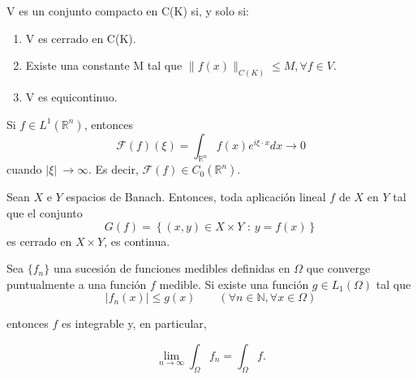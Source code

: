 \begin{lema}\label{thm:h05}
V es un conjunto compacto en C(K) si, y solo si:
\begin{enumerate}

	\item V es cerrado en C(K).
	\item Existe una constante M tal que \(\|f(x)\|_{C(K)} \leq M, \forall f \in V\).
	\item V es equicontinuo. 
\end{enumerate}
\end{lema}

\begin{lema}
Si $f\in L^{1}(\mathds{R}^{n})$, entonces 
\begin{equation}
\mathcal{F}(f)(\xi) = \int_{\mathds{R}^{n}}f(x)e^{i\xi\cdot x} dx \rightarrow 0
\end{equation}
 cuando  $\vert \xi \vert \ \rightarrow \infty$. Es decir, $\mathcal{F}(f)\in C_{0}(\mathds{R}^{n})$.
\end{lema}

\begin{teorema}\label{thm:h06}
Sean $X$ e $Y$ espacios de Banach. Entonces, toda aplicación lineal $f$ de $X$ en $Y$ tal que el conjunto
\begin{equation}
    G(f) = \left\{ (x,y)\in X\times Y \text{ : } y=f(x) \right\}
\end{equation}
es cerrado en $X\times Y$, es continua. 
\end{teorema}

\begin{teorema}

Sea $\{ f_n\}$ una sucesión de funciones medibles definidas en $\Omega$ que converge puntualmente a una función $f$ medible.  Si existe una función $g\in L_1 (\Omega)$ tal que 
\begin{equation}
    \vert f_n (x) \vert \leq g(x) \qquad (\forall n\in \mathds{N}, \forall x\in \Omega)
\end{equation}

entonces $f$ es integrable y, en particular, 

\begin{equation}
    \lim_{n\rightarrow \infty} \int_{\Omega}f_n = \int_{\Omega} f.
\end{equation}
\end{teorema}
